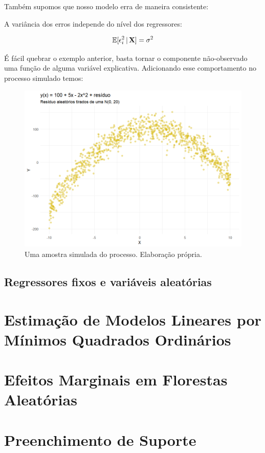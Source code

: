 Também supomos que nosso modelo erra de maneira consistente:

\begin{hipotese}[Homocedasticidade]
A variância dos erros independe do nível dos regressores:

\begin{align}
    \mathbb{E}[\epsilon_i^2\, |\, \mathbf{X} ] = \sigma^2
\end{align}


\end{hipotese}

\begin{exemplo}[Heterocedasticidade]
É fácil quebrar o exemplo anterior, basta tornar o componente não-observado uma função de alguma variável explicativa. Adicionando esse comportamento no processo simulado temos:

\begin{figure}[H]
    \centering
    \includegraphics[scale = .60]{imagens/exemplo3_dist.png}
    \caption{Uma amostra simulada do processo. Elaboração própria.}
\end{figure}



\end{exemplo}




\subsection{Regressores fixos e variáveis aleatórias}

\section{Estimação de Modelos Lineares por Mínimos Quadrados Ordinários}



\section{Efeitos Marginais em Florestas Aleatórias}






\section{Preenchimento de Suporte}
